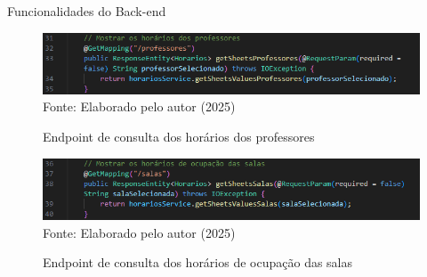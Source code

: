 \begin{frame}{Funcionalidades do Back-end}
    \begin{figure}
        \centering
        \vspace{-0.3cm}
        \caption{Endpoint de consulta dos horários dos professores}
        \vspace{-0.2cm}
        \includegraphics[width=1\textwidth]{figuras/back-5.png}
        \\ %
        \footnotesize Fonte: Elaborado pelo autor (2025)
    \end{figure}
    \begin{figure}
        \centering
        \vspace{-0.5cm}
        \caption{Endpoint de consulta dos horários de ocupação das salas}
        \vspace{-0.2cm}
        \includegraphics[width=1\textwidth]{figuras/back-6.png}
        \\ %
        \footnotesize Fonte: Elaborado pelo autor (2025)
    \end{figure}
\end{frame}

